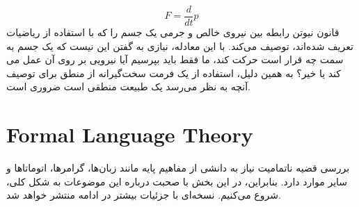 \documentclass[10pt,a4paper]{article}
\begin{document}
                \begin{equation}
                    F = \frac{d}{dt} p
                \end{equation}
قانون نیوتن رابطه بین نیروی خالص و جرمی یک جسم را که با استفاده از ریاضیات تعریف شده‌اند، توصیف می‌کند. با این معادله، نیازی به گفتن این نیست که یک جسم به سمت چه قرار است حرکت کند، ما فقط باید بپرسیم آیا نیرویی بر روی آن عمل می کند یا خیر؟ به همین دلیل، استفاده از یک فرمت سخت‌گیرانه از منطق برای توصیف آنچه به نظر می‌رسد یک طبیعت منطقی است ضروری است.
        
            \section{Formal Language Theory}
بررسی قضیه ناتمامیت نیاز به دانشی از مفاهیم پایه مانند زبان‌ها، گرامرها، اتوماتاها و سایر موارد دارد. بنابراین، در این بخش با صحبت درباره این موضوعات به شکل کلی، شروع می‌کنیم. نسخه‌ای با جزئیات بیشتر در ادامه منتشر خواهد شد.\cite{Leary2019-ip}
\end{document}
